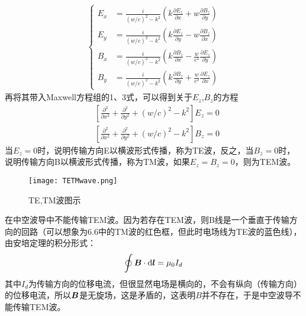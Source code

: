 \documentclass[14pt,oneside]{book}
\def \B{\vb*{B}}
\begin{document}
\begin{large}
\begin{align}
\begin{cases}
E_x & =\frac{i}{(w / c)^2-k^2}\left(k \frac{\partial E_z}{\partial x}+w \frac{\partial B_z}{\partial y}\right)\\
E_y&=\frac{i}{(w / c)^2-k^2}\left(k \frac{\partial E_z}{\partial y}-w \frac{\partial B_z}{\partial x}\right) \\
B_x & =\frac{i}{(w / c)^2-k^2}\left(k \frac{\partial B_z}{\partial x}-\frac{w}{c^2} \frac{\partial E_z}{\partial y}\right)\\
B_y&=\frac{i}{(w / c)^2-k^2}\left(k \frac{\partial B_z}{\partial y}+\frac{w}{c^2} \frac{\partial E_z}{\partial x}\right) 
\end{cases}
\end{align}
再将其带入Maxwell方程组的1、3式，可以得到关于$E_z$,$B_z$的方程
\begin{equation}
\begin{aligned}
& {\left[\frac{\partial^2}{\partial x^2}+\frac{\partial^2}{\partial y^2}+(w / c)^2-k^2\right] E_z=0} \\
& {\left[\frac{\partial^2}{\partial x^2}+\frac{\partial^2}{\partial y^2}+(w / c)^2-k^2\right] B_z=0}
\end{aligned}
\end{equation}
当$E_z=0$时，说明传输方向E以横波形式传播，称为TE波，反之，当$B_z=0$时，说明传输方向B以横波形式传播，称为TM波，如果$E_z=B_z=0$，则为TEM波。
\begin{figure}[H]
\centering
  \texttt{[image: TETMwave.png]}
  \caption{TE,TM波图示}
\end{figure}
在中空波导中不能传输TEM波。因为若存在TEM波，则B线是一个垂直于传输方向的回路（可以想象为6.6中的TM波的红色框，但此时电场线为TE波的蓝色线），由安培定理的积分形式：
\begin{equation}
  \oint \B\cdot \dd \vb*{l}=\mu_0I_d
\end{equation}
其中$I_d$为传输方向的位移电流，但很显然电场是横向的，不会有纵向（传输方向）的位移电流，所以$\vb*{B}$是无旋场，这是矛盾的，这表明$B$并不存在，于是中空波导不能传输TEM波。

\end{large}
\end{document}
